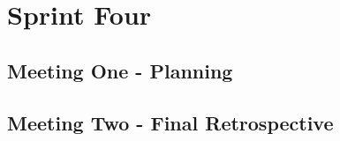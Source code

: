 \section{Sprint Four}

\subsection{Meeting One - Planning}

\subsection{Meeting Two - Final Retrospective}
